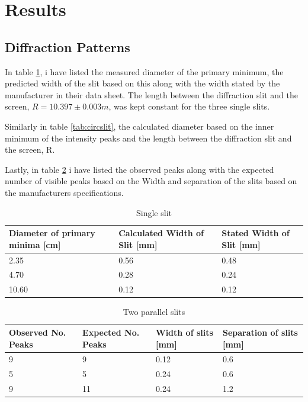 \documentclass[11pt,a4paper]{article}
\begin{document}
\section{\label{sect:results}Results}
    \subsection{Diffraction Patterns\label{sect:patterns}}

    In table \ref{tab:singleslit}, i have listed the measured diameter of the primary minimum, the predicted width of the slit based on this along with the width stated by the manufacturer in their data sheet. The length between the diffraction slit and the screen, $R=10.397\pm 0.003m $, was kept constant for the three single slits.

    Similarly in table \ref{tab:circslit}, the calculated diameter based on the inner minimum of the intensity peaks and the length between the diffraction slit and the screen, R.

    Lastly, in table \ref{tab:paraslit} i have listed the observed peaks along with the expected number of visible peaks based on the Width and separation of the slits based on the manufacturers specifications.

    \begin{table}[H]
        \center
        \caption{Single slit}
         \begin{tabular}{l l l}
            Diameter of primary minima [cm] & Calculated Width of Slit [mm] & Stated Width of Slit [mm] \\ \hline
            2.35 & 0.56 & 0.48 \\ 
            4.70 & 0.28 & 0.24 \\
            10.60 & 0.12 & 0.12
         \end{tabular}
         \label{tab:singleslit}
    \end{table}

    \begin{table}[H]
        \center
        \caption{Two parallel slits}
         \begin{tabular}{l l l l}
            Observed No. Peaks & Expected No. Peaks & Width of slits [mm] & Separation of slits [mm] \\ \hline
            9 & 9 & 0.12 & 0.6 \\
            5 & 5 & 0.24 & 0.6 \\
            9 & 11 & 0.24 & 1.2 
         \end{tabular}
         \label{tab:paraslit}
    \end{table}
\end{document}
